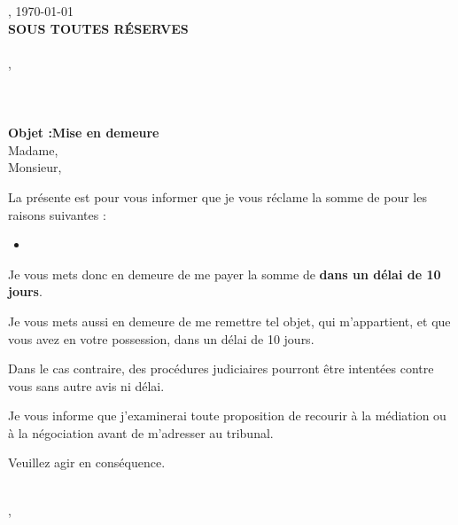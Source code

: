 
\noindent \LieuAuteur, \today\\[2em]
\noindent \textbf{SOUS TOUTES RÉSERVES}\\[2em]
\noindent \ModeEnvoi\\

\noindent \NomDestinataire, \TitreDestinataire\\
\noindent \EntrepriseDestinataire\\
\noindent \AdresseDestinataireUne\\
\noindent \AdresseDestinataireDeux\\

\noindent \textbf{Objet :\quad Mise en demeure}\\

Madame,\\
Monsieur,

La présente est pour vous informer que je vous réclame la somme de \textbf{\MontantReclame} pour les raisons suivantes :

\begin{itemize}
    \item \DescriptionProbleme
\end{itemize}

Je vous mets donc en demeure de me payer la somme de {\MontantReclame} \textbf{dans un délai de 10 jours}.

Je vous mets aussi en demeure de me remettre tel objet, qui m’appartient, et que vous avez en votre possession, dans un délai de 10 jours.

Dans le cas contraire, des procédures judiciaires pourront être intentées contre vous sans autre avis ni délai.

Je vous informe que j’examinerai toute proposition de recourir à la médiation ou à la négociation avant de m’adresser au tribunal.

Veuillez agir en conséquence.

\vspace{3em}

\NomAuteur\\
\AdresseAuteurUne, \AdresseAuteurDeux\\
\TelephoneAuteur
